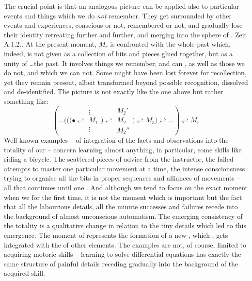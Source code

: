 \pa
The crucial point is that an analogous picture can be applied also to particular
events and things which we do {\em not} remember.  They get surrounded by other
events and experiences, conscious or not, remembered or not, and gradually lose
their identity retreating further and further, and merging into the sphere of
.  \citet{As the time-object withdraws into the
  past, it shrinks and therewith becomes dim.}{Zeit}{ A:1.2.{.} }  At the present moment, $M_{r}$ is confronted with
the whole past which, indeed, is not given as a collection of bits and pieces
glued together, but as a  unity of \ldots the past.  It involves
things we remember, and can , as well as those we do not, and
which we can not.
Some might have been lost forever for 
recollection, yet they remain present, albeit transformed beyond
possible recognition, dissolved and de-identified.
The picture is not exactly like the one above but rather
something like:
\[
  (\ldots\Big(\bigg( \Bigg(\bullet 
     \rightleftharpoons 
     \begin{array}{c}{\scriptscriptstyle{\vdots}}\\[-.5ex]
                     {\scriptscriptstyle{M_{1}}}\\ [-.5ex]
                     {\scriptscriptstyle{{\vdots}}}\end{array} 
     \Bigg) 
     \rightleftharpoons 
     \begin{array}{c}{\scriptstyle{M_{2}'}}\\[-.5ex]
                     {\scriptstyle{M_{2}}}\\ [-.5ex]
                     {\scriptstyle{{M_{2}''}}}\end{array} 
     \displaystyle\bigg)
     \rightleftharpoons M_{3}\Big) \rightleftharpoons \ldots )
     \rightleftharpoons M_{r}
\]
Well known examples -- of integration of the  facts and
observations into the totality of our  -- concern 
learning almost anything, in particular, some skills like riding a
bicycle. The scattered pieces of advice from the instructor, the failed attempts
to master one particular movement at a time, the intense consciousness trying
to organise all the bits in proper sequences and alliances of movements -- all 
that continues until one . And although we tend to focus on
the exact moment when we  for the first time, it is not the moment which
is important but the fact that all the labourious details, all the minute
successes and failures recede into the background of almost unconscious
automatism. The emerging consistency of the totality is a qualitative change in
relation to the tiny details which led to this emergence. The moment of
 represents the formation of a new , which
, gets integrated with the  of other elements.
The examples are not, of course, limited to acquiring motoric skills
-- learning to solve differential equations has exactly the same structure of
painful details receding gradually into the background of the acquired
skill.

